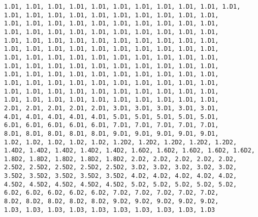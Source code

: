 \begin{verbatim}
1.D1, 1.D1, 1.D1, 1.D1, 1.D1, 1.D1, 1.D1, 1.D1, 1.D1, 1.D1, 1.D1,
1.D1, 1.D1, 1.D1, 1.D1, 1.D1, 1.D1, 1.D1, 1.D1, 1.D1, 1.D1,
1.D1, 1.D1, 1.D1, 1.D1, 1.D1, 1.D1, 1.D1, 1.D1, 1.D1, 1.D1,
1.D1, 1.D1, 1.D1, 1.D1, 1.D1, 1.D1, 1.D1, 1.D1, 1.D1, 1.D1,
1.D1, 1.D1, 1.D1, 1.D1, 1.D1, 1.D1, 1.D1, 1.D1, 1.D1, 1.D1,
1.D1, 1.D1, 1.D1, 1.D1, 1.D1, 1.D1, 1.D1, 1.D1, 1.D1, 1.D1,
1.D1, 1.D1, 1.D1, 1.D1, 1.D1, 1.D1, 1.D1, 1.D1, 1.D1, 1.D1,
1.D1, 1.D1, 1.D1, 1.D1, 1.D1, 1.D1, 1.D1, 1.D1, 1.D1, 1.D1,
1.D1, 1.D1, 1.D1, 1.D1, 1.D1, 1.D1, 1.D1, 1.D1, 1.D1, 1.D1,
1.D1, 1.D1, 1.D1, 1.D1, 1.D1, 1.D1, 1.D1, 1.D1, 1.D1, 1.D1,
1.D1, 1.D1, 1.D1, 1.D1, 1.D1, 1.D1, 1.D1, 1.D1, 1.D1, 1.D1,
1.D1, 1.D1, 1.D1, 1.D1, 1.D1, 1.D1, 1.D1, 1.D1, 1.D1, 1.D1,
2.D1, 2.D1, 2.D1, 2.D1, 2.D1, 3.D1, 3.D1, 3.D1, 3.D1, 3.D1,
4.D1, 4.D1, 4.D1, 4.D1, 4.D1, 5.D1, 5.D1, 5.D1, 5.D1, 5.D1,
6.D1, 6.D1, 6.D1, 6.D1, 6.D1, 7.D1, 7.D1, 7.D1, 7.D1, 7.D1,
8.D1, 8.D1, 8.D1, 8.D1, 8.D1, 9.D1, 9.D1, 9.D1, 9.D1, 9.D1,
1.D2, 1.D2, 1.D2, 1.D2, 1.D2, 1.2D2, 1.2D2, 1.2D2, 1.2D2, 1.2D2,
1.4D2, 1.4D2, 1.4D2, 1.4D2, 1.4D2, 1.6D2, 1.6D2, 1.6D2, 1.6D2, 1.6D2,
1.8D2, 1.8D2, 1.8D2, 1.8D2, 1.8D2, 2.D2, 2.D2, 2.D2, 2.D2, 2.D2, 
2.5D2, 2.5D2, 2.5D2, 2.5D2, 2.5D2, 3.D2, 3.D2, 3.D2, 3.D2, 3.D2, 
3.5D2, 3.5D2, 3.5D2, 3.5D2, 3.5D2, 4.D2, 4.D2, 4.D2, 4.D2, 4.D2, 
4.5D2, 4.5D2, 4.5D2, 4.5D2, 4.5D2, 5.D2, 5.D2, 5.D2, 5.D2, 5.D2, 
6.D2, 6.D2, 6.D2, 6.D2, 6.D2, 7.D2, 7.D2, 7.D2, 7.D2, 7.D2, 
8.D2, 8.D2, 8.D2, 8.D2, 8.D2, 9.D2, 9.D2, 9.D2, 9.D2, 9.D2, 
1.D3, 1.D3, 1.D3, 1.D3, 1.D3, 1.D3, 1.D3, 1.D3, 1.D3, 1.D3


\end{verbatim}
